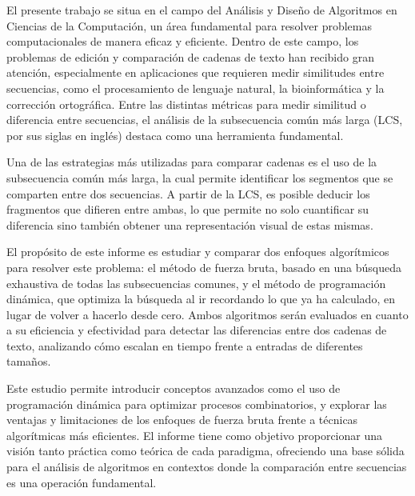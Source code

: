 El presente trabajo se situa en el campo del Análisis y Diseño de Algoritmos en Ciencias de la Computación, un área fundamental para resolver problemas computacionales de manera eficaz y eficiente. Dentro de este campo, los problemas de edición y comparación de cadenas de texto han recibido gran atención, especialmente en aplicaciones que requieren medir similitudes entre secuencias, como el procesamiento de lenguaje natural, la bioinformática \cite{contreras2018algoritmos} y la corrección ortográfica. Entre las distintas métricas para medir similitud o diferencia entre secuencias, el análisis de la subsecuencia común más larga (LCS, por sus siglas en inglés) destaca como una herramienta fundamental.

\vspace{0.5 cm}

Una de las estrategias más utilizadas para comparar cadenas es el uso de la subsecuencia común más larga, la cual permite identificar los segmentos que se comparten entre dos secuencias. A partir de la LCS, es posible deducir los fragmentos que difieren entre ambas, lo que permite no solo cuantificar su diferencia sino también obtener una representación visual de estas mismas.

\vspace{0.5 cm}

El propósito de este informe es estudiar y comparar dos enfoques algorítmicos para resolver este problema: el método de fuerza bruta, basado en una búsqueda exhaustiva de todas las subsecuencias comunes, y el método de programación dinámica, que optimiza la búsqueda al ir recordando lo que ya ha calculado, en lugar de volver a hacerlo desde cero. Ambos algoritmos serán evaluados en cuanto a su eficiencia y efectividad para detectar las diferencias entre dos cadenas de texto, analizando cómo escalan en tiempo frente a entradas de diferentes tamaños.

\vspace{0.5 cm}

Este estudio permite introducir conceptos avanzados como el uso de programación dinámica para optimizar procesos combinatorios, y explorar las ventajas y limitaciones de los enfoques de fuerza bruta frente a técnicas algorítmicas más eficientes. El informe tiene como objetivo proporcionar una visión tanto práctica como teórica de cada paradigma, ofreciendo una base sólida para el análisis de algoritmos en contextos donde la comparación entre secuencias es una operación fundamental.
